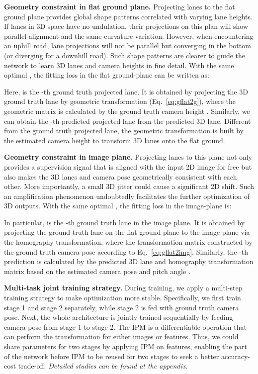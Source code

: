 \documentclass[letterpaper]{article} \usepackage{aaai22}  \usepackage{times}  \usepackage{helvet}  \usepackage{courier}  \usepackage[hyphens]{url}  \usepackage{graphicx} \urlstyle{rm} \def\UrlFont{\rm}  \usepackage{natbib}  \usepackage{caption}
\begin{document}
\noindent \textbf{Geometry constraint in flat ground plane.}
Projecting lanes to the flat ground plane provides global shape patterns correlated with varying lane heights. If lanes in 3D space have no undulation, their projections on this plan will show parallel alignment and the same curvature variation. However, when encountering an uphill road, lane projections will not be parallel but converging in the bottom (or diverging for a downhill road). Such shape patterns are clearer to guide the network to learn 3D lanes and camera heights in fine detail. With the same optimal ,  the fitting loss in the flat ground-plane can be written as:

Here,  is the -th ground truth projected lane.  It is obtained by projecting the 3D ground truth lane by geometric transformation (Eq.~\ref{eq:gflat2g}), where the geometric matrix is calculated by the ground truth camera height . Similarly, we can obtain the -th predicted projected lane  from the predicted 3D lane. Different from the ground truth projected lane, the geometric transformation  is built by the estimated camera height  to transform 3D lanes onto the flat ground.



\noindent \textbf{Geometry constraint in image plane.}
Projecting lanes to this plane not only provides a supervision signal that is aligned with the input 2D image for free but also makes the 3D lanes and camera pose geometrically consistent with each other. More importantly, a small 3D jitter could cause a significant 2D shift. Such an amplification phenomenon undoubtedly facilitates the further optimization of 3D outputs. With the same optimal , the fitting loss in the image-plane is:

In particular,  is the -th ground truth lane in the image plane. It is obtained by projecting the ground truth lane on the flat ground plane to the image plane via the homography transformation, where the transformation matrix constructed by the ground truth camera pose according to   
Eq.~\ref{eq:gflat2img}. Similarly, the -th prediction  is calculated by the predicted 3D lane and homography transformation matrix  based on the estimated camera pose  and pitch angle .



\noindent \textbf{Multi-task joint training strategy.} During training, we apply a multi-step training strategy to make optimization more stable. Specifically, we first train stage 1 and stage 2 separately, while stage 2 is fed with ground truth camera pose. Next, the whole architecture is jointly trained sequentially by feeding camera pose from stage 1 to stage 2. The IPM is a differentiable operation that can perform the transformation for either images or features. Thus, we could share parameters for two stages by applying IPM on features, enabling the part of the network before IPM to be reused for two stages to seek a better accuracy-cost trade-off. \textit{Detailed studies can be found at the appendix.}
\end{document}
